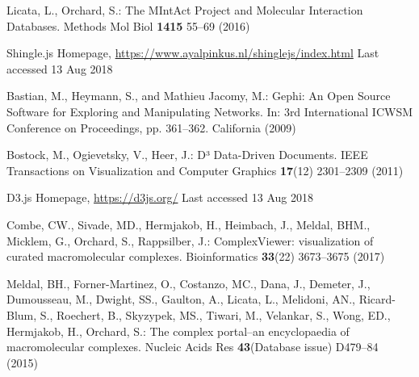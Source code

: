 \documentclass[runningheads]{llncs}
\begin{document}
%
%
%
% 
% 
%
\begin{thebibliography}{7}
Licata, L., Orchard, S.: The MIntAct Project and Molecular Interaction Databases. Methods Mol Biol \textbf{1415} 55--69 (2016) 

Shingle.js Homepage, \url{https://www.ayalpinkus.nl/shinglejs/index.html} Last accessed 13 Aug 2018

Bastian, M., Heymann, S., and Mathieu Jacomy, M.: Gephi: An Open Source Software for Exploring and Manipulating Networks. In:  3rd International ICWSM Conference on Proceedings, pp. 361--362. California (2009)

Bostock, M., Ogievetsky, V., Heer, J.: D³ Data-Driven Documents. IEEE Transactions on Visualization and Computer Graphics \textbf{17}(12) 2301--2309 (2011) 

D3.js Homepage, \url{https://d3js.org/} Last accessed 13 Aug 2018

Combe, CW., Sivade, MD., Hermjakob, H., Heimbach, J., Meldal, BHM., Micklem, G., Orchard, S., Rappsilber, J.: ComplexViewer: visualization of curated macromolecular complexes. Bioinformatics \textbf{33}(22) 3673--3675 (2017) 

Meldal, BH., Forner-Martinez, O., Costanzo, MC., Dana, J., Demeter, J., Dumousseau, M., Dwight, SS., Gaulton, A., Licata, L., Melidoni, AN., Ricard-Blum, S., Roechert, B., Skyzypek, MS., Tiwari, M., Velankar, S., Wong, ED., Hermjakob, H., Orchard, S.: The complex portal--an encyclopaedia of macromolecular complexes. Nucleic Acids Res \textbf{43}(Database issue) D479--84 (2015) 

\end{thebibliography}
\end{document}
